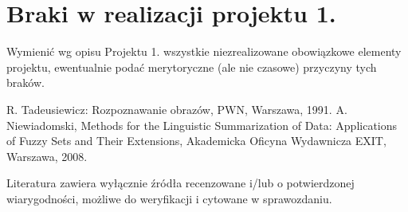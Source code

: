 \documentclass{classrep}
\begin{document}


\section{Braki w realizacji projektu 1.}
Wymienić wg opisu Projektu 1. wszystkie niezrealizowane obowiązkowe elementy projektu, ewentualnie
podać merytoryczne (ale nie czasowe) przyczyny tych braków. 


\begin{thebibliography}{0}
 R. Tadeusiewicz: Rozpoznawanie obrazów, PWN, Warszawa, 1991.  
 A. Niewiadomski, Methods for the Linguistic Summarization of Data: Applications of Fuzzy Sets and Their Extensions, Akademicka Oficyna Wydawnicza EXIT, Warszawa, 2008.
\end{thebibliography}

Literatura zawiera wyłącznie źródła recenzowane i/lub o potwierdzonej wiarygodności,
możliwe do weryfikacji i cytowane w sprawozdaniu. 
\end{document}
